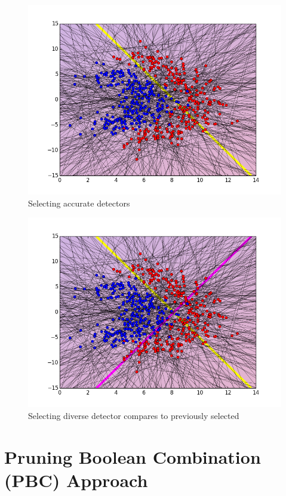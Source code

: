 \begin{figure}[H]
\centering
\includegraphics[width=1\linewidth]{figs/Lithuanian/Initial_detectors}
\caption{Selecting accurate detectors}
\label{fig::accurate_detector}
\end{figure}

\begin{figure}[H]
\centering
\includegraphics[width=1\linewidth]{figs/Lithuanian/complement_detectors}
\caption{Selecting diverse detector compares to previously selected}
\label{fig::diverse_detector}
\end{figure}


\section{Pruning Boolean Combination (PBC) Approach}
\label{sec:pbc}

